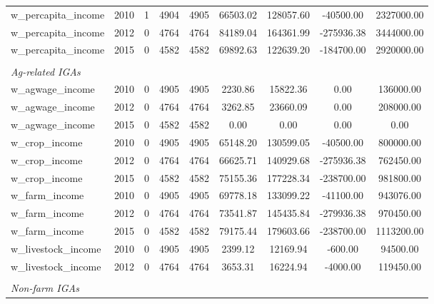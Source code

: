 \documentclass[a4paper,11pt]{article}
\begin{document}
\begin{table}[H]
{\begin{tabular}{lcccccccc}
    w\_percapita\_income & 2010  & 1     & 4904  & 4905  & 66503.02 & 128057.60 & -40500.00 & 2327000.00 \\
    w\_percapita\_income & 2012  & 0     & 4764  & 4764  & 84189.04 & 164361.99 & -275936.38 & 3444000.00 \\
    w\_percapita\_income & 2015  & 0     & 4582  & 4582  & 69892.63 & 122639.20 & -184700.00 & 2920000.00 \\
    
        & & & & & & & & \\

  \textit{Ag-related IGAs}  & & &  &  & & & \\ 

   
    w\_agwage\_income & 2010  & 0     & 4905  & 4905  & 2230.86 & 15822.36 & 0.00  & 136000.00 \\
    w\_agwage\_income & 2012  & 0     & 4764  & 4764  & 3262.85 & 23660.09 & 0.00  & 208000.00 \\
    w\_agwage\_income & 2015  & 0     & 4582  & 4582  & 0.00  & 0.00  & 0.00  & 0.00 \\

   w\_crop\_income & 2010  & 0     & 4905  & 4905  & 65148.20 & 130599.05 & -40500.00 & 800000.00 \\
    w\_crop\_income & 2012  & 0     & 4764  & 4764  & 66625.71 & 140929.68 & -275936.38 & 762450.00 \\
    w\_crop\_income & 2015  & 0     & 4582  & 4582  & 75155.36 & 177228.34 & -238700.00 & 981800.00 \\
    w\_farm\_income & 2010  & 0     & 4905  & 4905  & 69778.18 & 133099.22 & -41100.00 & 943076.00 \\
    w\_farm\_income & 2012  & 0     & 4764  & 4764  & 73541.87 & 145435.84 & -279936.38 & 970450.00 \\
    w\_farm\_income & 2015  & 0     & 4582  & 4582  & 79175.44 & 179603.66 & -238700.00 & 1113200.00 \\
    w\_livestock\_income & 2010  & 0     & 4905  & 4905  & 2399.12 & 12169.94 & -600.00 & 94500.00 \\
    w\_livestock\_income & 2012  & 0     & 4764  & 4764  & 3653.31 & 16224.94 & -4000.00 & 119450.00 \\

    & & & & & & & & \\
 \textit{Non-farm IGAs}  & & &  &  & & & \\ 


\end{tabular}}
\end{table}
\end{document}
